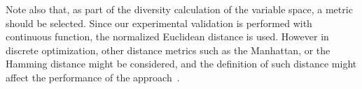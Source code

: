 Note also that, as part of the diversity calculation of the variable space, a metric should be selected.
%
Since our experimental validation is performed with continuous function, the normalized Euclidean distance is used.
%
However in discrete optimization, other distance metrics such as the Manhattan, or the Hamming distance might be considered, and the definition of
such distance might affect the performance of the approach~\cite{Segura:17}.


%
%
%

%
%
%

%
%
%
%
%
%
%

%
%
%
%


